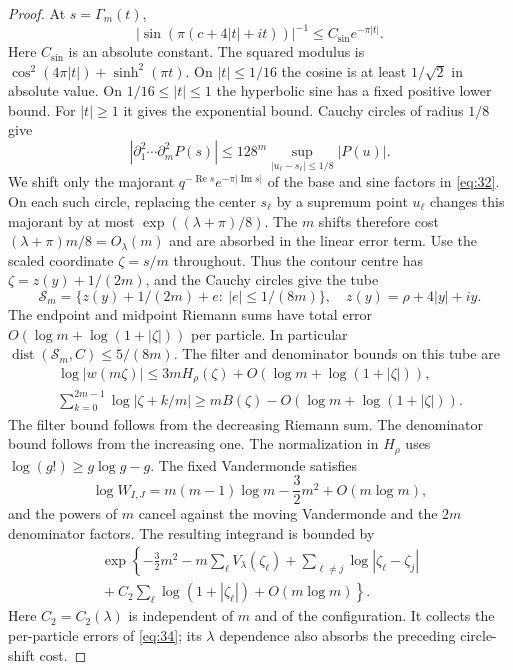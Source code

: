 \begin{proof}
At $s=\Gamma_m(t)$,
\begin{equation}
 |\sin(\pi(c+4|t|+it))|^{-1}\le C_{\sin}e^{-\pi|t|}.             \label{eq:32}
\end{equation}
Here $C_{\sin}$ is an absolute constant. The squared modulus is
$\cos^2(4\pi|t|)+\sinh^2(\pi t)$. On $|t|\le1/16$ the cosine is at least
$1/\sqrt2$ in absolute value. On $1/16\le|t|\le1$ the hyperbolic sine has a
fixed positive lower bound. For $|t|\ge1$ it gives the exponential
bound. Cauchy circles of radius $1/8$ give
\begin{equation}
 |\partial_1^2\cdots\partial_m^2P(s)|
 \le128^m\sup_{|u_\ell-s_\ell|\le1/8}|P(u)|.               \label{eq:33}
\end{equation}
We shift only the majorant $q^{-\operatorname{Re}s}e^{-\pi|\operatorname{Im}s|}$
of the base and sine factors in \eqref{eq:32}. On each such circle,
replacing the center $s_\ell$ by a supremum point $u_\ell$ changes this
majorant by at most $\exp((\lambda+\pi)/8)$. The $m$ shifts therefore cost
$(\lambda+\pi)m/8=O_\lambda(m)$ and are absorbed in the linear error term.
Use the scaled coordinate $\zeta=s/m$ throughout. Thus the contour centre
has $\zeta=z(y)+1/(2m)$, and the Cauchy circles give the tube
\[
 {\mathcal S}_m=\{z(y)+1/(2m)+e:\ |e|\le1/(8m)\},\quad
 z(y)=\rho+4|y|+iy.
\]
The endpoint and midpoint Riemann sums have total error
$O(\log m+\log(1+|\zeta|))$ per particle. In particular
$\operatorname{dist}({\mathcal S}_m,C)\le5/(8m)$. The filter and
denominator bounds on this tube are
\begin{equation}
\begin{aligned}
 \log|w(m\zeta)|\le3mH_\rho(\zeta)
 +O\!\left(\log m+\log(1+|\zeta|)\right),\\
 \sum_{k=0}^{2m-1}\log|\zeta+k/m|
 \ge mB(\zeta)-O\!\left(\log m+\log(1+|\zeta|)\right).    \label{eq:34}
\end{aligned}
\end{equation}
The filter bound follows from the decreasing Riemann sum. The denominator
bound follows from the increasing one.
The normalization in $H_\rho$ uses $\log(g!)\ge g\log g-g$. The fixed
Vandermonde satisfies
\[
 \log W_{I,J}=m(m-1)\log m-\frac32m^2+O(m\log m),
\]
and the powers of $m$ cancel against the moving Vandermonde and the $2m$
denominator factors. The resulting integrand is bounded by
\begin{multline}
 \exp\left\{-\frac32m^2-m\sum_\ell V_\lambda(\zeta_\ell)
 +\sum_{\ell\ne j}\log|\zeta_\ell-\zeta_j|\right.\\
 \left.{}+C_2\sum_\ell\log(1+|\zeta_\ell|)+O(m\log m)\right\}.  \label{eq:35}
\end{multline}
Here $C_2=C_2(\lambda)$ is independent of $m$ and of the configuration. It
collects the per-particle errors of \eqref{eq:34}; its $\lambda$ dependence
also absorbs the preceding circle-shift cost.


\end{proof}
